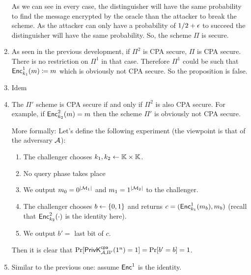 \begin{solution}
\begin{enumerate}
\begin{center}
	\end{center}
	As we can see in every case, the distinguisher will have the same probability to find the message encrypted by the oracle than the attacker to break the scheme. As the attacker can only have a probability of $1/2 + \negl$ to succeed the distinguisher will have the same probability. So, the scheme $\Pi$ is secure.

	\item As seen in the previous development, if $\Pi^2$ is CPA secure, $\Pi$ is CPA secure. There is no restriction on $\Pi^1$ in that case. Therefore $\Pi^1$ could be such that $\Enc^1_{k_1}(m)\define m$ which is obviously not CPA secure. So the proposition is false.

	\item Idem

	\item The $\Pi'$ scheme is CPA secure if and only if $\Pi^2$ is also CPA secure. For example, if $\Enc_{k_2}^2(m) = m$ then the scheme $\Pi'$ is obviously not CPA secure.

	More formally: Let's define the following experiment (the viewpoint is that of the adversary $\A$):
	\begin{enumerate}[label=(\arabic*)]
		\item The challenger chooses $k_1, k_2 \pick \K \times \K$.
		\item No query phase takes place
		\item We output $m_0=0^\abs{\M_1}$ and $m_1=1^\abs{\M_2}$ to the challenger.
		\item The challenger chooses $b \pick \bset$ and returns $c=(\Enc^1_{k_1}(m_b), m_b)$ (recall that $\Enc^2_{k_2}(\cdot)$ is the identity here).
		\item We output $b'=$ last bit of $c$.
	\end{enumerate}
	Then it is clear that $\Pr[\PrivKcpa[\A, \Pi'](1^n)=1] = \Pr[b'=b] = 1$.

	\item Similar to the previous one: assume $\Enc^1$ is the identity.


\end{enumerate}
\end{solution}
